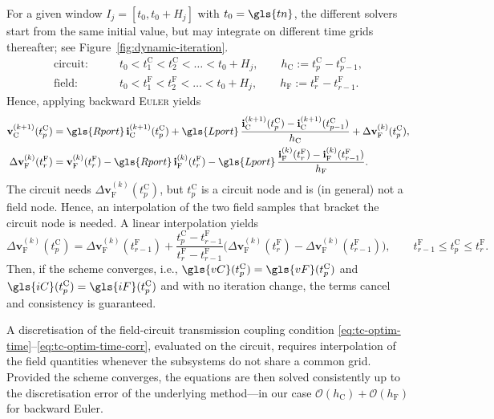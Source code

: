 For a given window $I_j = [t_0, t_0 + H_j]$ with $t_0 = \gls{tn}$, the different solvers start from the same initial value, but may integrate on different time grids thereafter; see Figure~\ref{fig:dynamic-iteration}.
\begin{align*}
    \text{circuit:} \qquad &t_0 < t_1^{\text{C}} < t_2^{\text{C}} < \dots < t_0 + H_j, \qquad h_{\text{C}} := t_p^{\text{C}} - t_{p-1}^{\text{C}}, \\
    \text{field:} \qquad &t_0 < t_1^{\text{F}} < t_2^{\text{F}} < \dots < t_0 + H_j, \qquad h_{\text{F}} := t_r^{\text{F}} - t_{r-1}^{\text{F}}.
\end{align*}
Hence, applying backward \textsc{Euler} yields
\begin{align*}
    \mathbf{v}_{\text{C}}^{(k+1)}(t_{p}^{\text{C}}) &= \gls{Rport} \, \mathbf{i}_{\text{C}}^{(k+1)}(t_{p}^{\text{C}}) + \gls{Lport} \, \frac{\mathbf{i}_{\text{C}}^{(k+1)}(t_{p}^{\text{C}}) - \mathbf{i}_{\text{C}}^{(k+1)}(t_{p-1}^{\text{C}})}{h_{\text{C}}} + \Delta \mathbf{v}_{\text{F}}^{(k)}(t_{p}^{\text{C}}), \\
    \Delta \mathbf{v}_{\text{F}}^{(k)}(t_{r}^{\text{F}}) &= \mathbf{v}_{\text{F}}^{(k)}(t_{r}^{\text{F}}) - \gls{Rport} \, \mathbf{i}_{\text{F}}^{(k)}(t_{r}^{\text{F}}) - \gls{Lport} \, \frac{\mathbf{i}_{\text{F}}^{(k)}(t_{r}^{\text{F}}) - \mathbf{i}_{\text{F}}^{(k)}(t_{r-1}^{\text{F}})}{h_{\text{F}}}.
\end{align*}
The circuit needs $\Delta \mathbf{v}_{\text{F}}^{(k)}(t_p^{\text{C}})$, but $t_p^{\text{C}}$ is a circuit node and is (in general) not a field node. Hence, an interpolation of the two field samples that bracket the circuit node is needed. A linear interpolation yields
\begin{equation*}
    \Delta \mathbf{v}_{\text{F}}^{(k)}(t_p^{\text{C}}) = \Delta \mathbf{v}_{\text{F}}^{(k)}(t_{r-1}^{\text{F}}) + \frac{t_{p}^{\text{C}} - t_{r-1}^{\text{F}}}{t_{r}^{\text{F}} - t_{r-1}^{\text{F}}} \big( \Delta \mathbf{v}_{\text{F}}^{(k)}(t_{r}^{\text{F}}) - \Delta \mathbf{v}_{\text{F}}^{(k)}(t_{r-1}^{\text{F}}) \big), \qquad t_{r-1}^{\text{F}} \leq t_{p}^{\text{C}} \leq t_{r}^{\text{F}}.
\end{equation*}
Then, if the scheme converges, i.e., $\gls{vC}(t_p^{\text{C}}) = \gls{vF}(t_p^{\text{C}})$ and $\gls{iC}(t_p^{\text{C}}) = \gls{iF}(t_p^{\text{C}})$ and with no iteration change, the terms cancel and consistency is guaranteed.

\begin{corollary} \label{corollary:naive-error}
    A  discretisation of the field-circuit transmission coupling condition \eqref{eq:tc-optim-time}--\eqref{eq:tc-optim-time-corr}, evaluated on the circuit, requires interpolation of the field quantities whenever the subsystems do not share a common grid. Provided the scheme converges, the equations are then solved consistently up to the discretisation error of the underlying method---in our case $\mathcal{O}(h_{\text{C}}) + \mathcal{O}(h_{\text{F}})$ for backward Euler.
\end{corollary}

